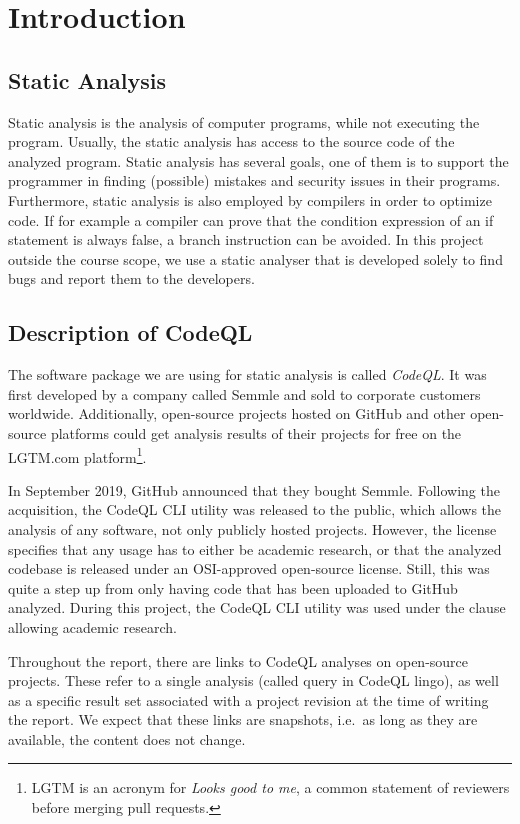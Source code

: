\section{Introduction}
\subsection{Static Analysis}
Static analysis is the analysis of computer programs, while not executing the program.
Usually, the static analysis has access to the source code of the analyzed program.
Static analysis has several goals, one of them is to support the programmer in finding (possible) mistakes and
security issues in their programs.
Furthermore, static analysis is also employed by compilers in order to optimize code.
If for example a compiler can prove that the condition expression of an if statement is always false,
a branch instruction can be avoided.
In this project outside the course scope, we use a static analyser that is developed
solely to find bugs and report them to the developers.

\subsection{Description of CodeQL}
The software package we are using for static analysis is called \emph{CodeQL}.
It was first developed by a company called Semmle and sold to corporate customers worldwide.
Additionally, open-source projects hosted on GitHub and other open-source platforms could
get analysis results of their projects for free on the LGTM.com platform\footnote{LGTM 
is an acronym for \emph{Looks good to me}, a common statement of reviewers before merging
pull requests.}.

In September 2019, GitHub announced that they bought Semmle.
Following the acquisition, the CodeQL CLI utility was released to the public,
which allows the analysis of any software, not only publicly hosted projects.
However, the license specifies that any usage has to either be academic research,
or that the analyzed codebase is released under an OSI-approved open-source license.
Still, this was quite a step up from only having code that has been uploaded to
GitHub analyzed.
During this project, the CodeQL CLI utility was used under the clause allowing academic research.

Throughout the report, there are links to CodeQL analyses on open-source projects.
These refer to a single analysis (called query in CodeQL lingo), as well as a specific result
set associated with a project revision at the time of writing the report.
We expect that these links are snapshots, i.e.\ as long as they are available,
the content does not change.


